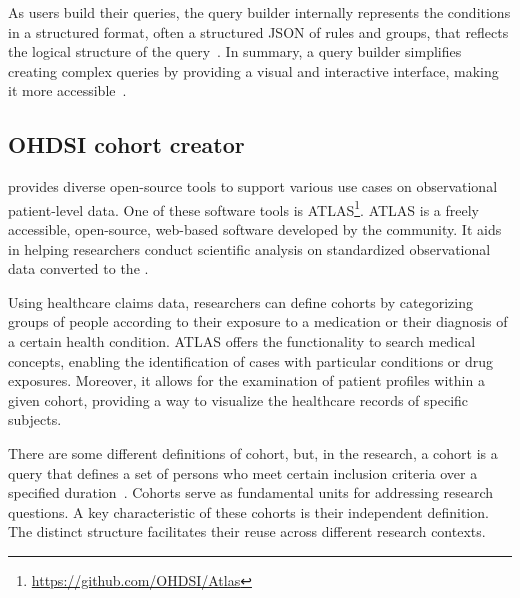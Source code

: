 As users build their queries, the query builder internally represents the conditions in a structured format, often a structured JSON of rules and groups, that reflects the logical structure of the query~\cite{noauthor_jquery_nodate}. In summary, a query builder simplifies creating complex queries by providing a visual and interactive interface, making it more accessible~\cite{noauthor_introducing_2021}.


\subsection{OHDSI cohort creator}
\label{atlas}

{\ohdsi} provides diverse open-source tools to support various use cases on observational patient-level data. One of these software tools is ATLAS\footnote{\url{https://github.com/OHDSI/Atlas}}. ATLAS is a freely accessible, open-source, web-based software developed by the {\ohdsi} community. It aids in helping researchers conduct scientific analysis on standardized observational data converted to the {\omop}.

Using healthcare claims data, researchers can define cohorts by categorizing groups of people according to their exposure to a medication or their diagnosis of a certain health condition. ATLAS offers the functionality to search medical concepts, enabling the identification of cases with particular conditions or drug exposures. Moreover, it allows for the examination of patient profiles within a given cohort, providing a way to visualize the healthcare records of specific subjects.

There are some different definitions of cohort, but, in the {\ohdsi} research, a cohort is a query that defines a set of persons who meet certain inclusion criteria over a specified duration~\cite{informatics_chapter_nodate}. Cohorts serve as fundamental units for addressing research questions. A key characteristic of these cohorts is their independent definition. The distinct structure facilitates their reuse across different research contexts.


